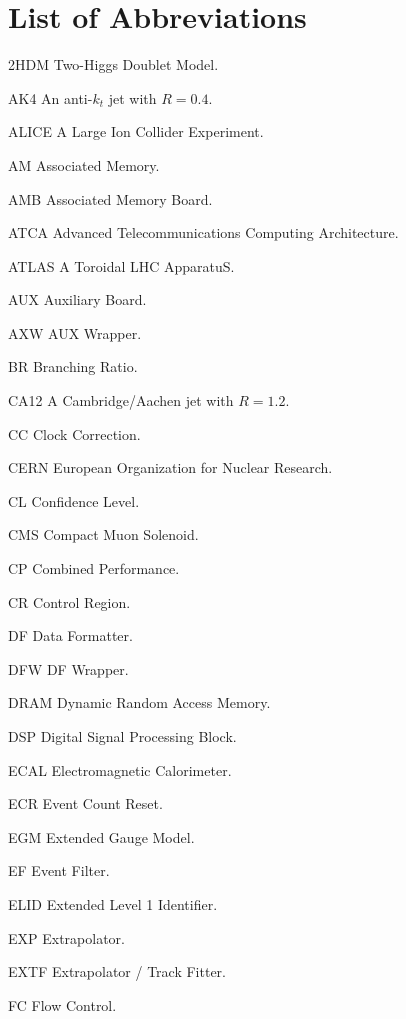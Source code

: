 \chapter{List of Abbreviations}

\begin{symbollist*}
\item[2HDM] Two-Higgs Doublet Model.
\item[AK4] An anti-$k_t$ jet with $R = 0.4$.
\item[ALICE] A Large Ion Collider Experiment.
\item[AM] Associated Memory.
\item[AMB] Associated Memory Board.
\item[ATCA] Advanced Telecommunications Computing Architecture.
\item[ATLAS] A Toroidal LHC ApparatuS.
\item[AUX] Auxiliary Board.
\item[AXW] AUX Wrapper.
\item[BR] Branching Ratio.
\item[CA12] A Cambridge/Aachen jet with $R = 1.2$.
\item[CC] Clock Correction.
\item[CERN] European Organization for Nuclear Research.
\item[CL] Confidence Level.
\item[CMS] Compact Muon Solenoid.
\item[CP] Combined Performance.
\item[CR] Control Region.
\item[DF] Data Formatter.
\item[DFW] DF Wrapper.
\item[DRAM] Dynamic Random Access Memory.
\item[DSP] Digital Signal Processing Block.
\item[ECAL] Electromagnetic Calorimeter.
\item[ECR] Event Count Reset.
\item[EGM] Extended Gauge Model.
\item[EF] Event Filter.
\item[ELID] Extended Level 1 Identifier.
\item[EXP] Extrapolator.
\item[EXTF] Extrapolator / Track Fitter.
\item[FC] Flow Control.

\end{symbollist*}
